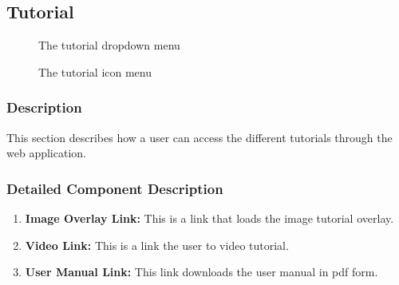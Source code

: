 \documentclass[14pt, a4paper]{article}
\begin{document}
\subsection{Tutorial} 
	\begin{figure}[H]
		\centerline{}
		\caption{The tutorial dropdown menu}
		\label{fig:tut1}
	\end{figure}
	\begin{figure}[H]
		\centerline{}
		\caption{The tutorial icon menu}
		\label{fig:tut2}
	\end{figure}
	\subsubsection{Description}This section describes how a user can access the different tutorials through the web application.
	\subsubsection{Detailed Component Description}
		\begin{enumerate}
			\item \textbf{Image Overlay Link:} This is a link that loads the image tutorial overlay.
			\item \textbf{Video Link:} This is a link the user to video tutorial.
			\item \textbf{User Manual Link:} This link downloads the user manual in pdf form.
		\end{enumerate}
\end{document}
